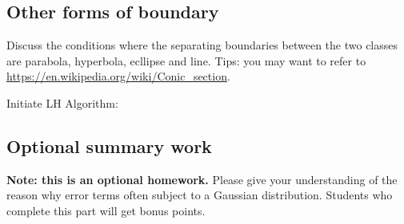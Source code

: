 \documentclass{article}
\newenvironment{answer}{\par\color{ForestGreen}}{\par}
\begin{document}
\subsection{Other forms of boundary}
Discuss the conditions where the separating boundaries between the two classes are parabola,
hyperbola, ecllipse and line. Tips: you may want to refer to \url{ https://en.wikipedia.org/wiki/Conic_section}.
\begin{answer}
    Initiate LH Algorithm:
\end{answer}

\subsection{Optional summary work}
\textbf{Note: this is an optional homework.} Please give your understanding of the reason
why error terms often subject to a Gaussian distribution. Students who complete this part
will get bonus points.
\end{document}
